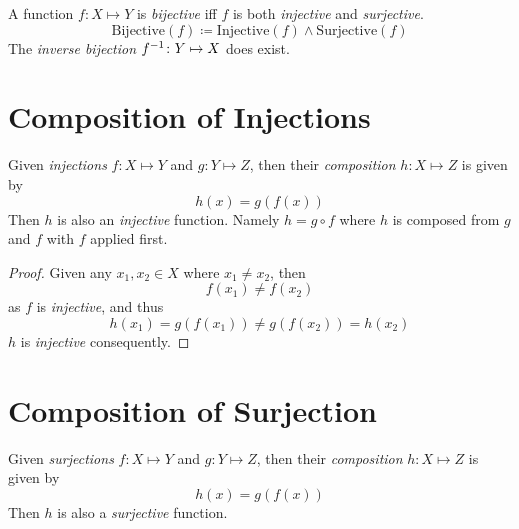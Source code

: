 \begin{definition}[Bijection]
    A function $f \colon X \mapsto Y$ is \textit{bijective} iff $f$ is both \textit{injective} and \textit{surjective}.
    \begin{equation}
        \mathrm{Bijective}(f) \coloneqq \mathrm{Injective}(f) \land \mathrm{Surjective}(f)
    \end{equation}
    The \textit{inverse bijection} ${f}^{-1} \colon Y \mapsto X$ does exist.
\end{definition}

\section{Composition of Injections}
\begin{proposition}
    Given \textit{injections} $f \colon X \mapsto Y$ and $g \colon Y \mapsto Z$, then their \textit{composition} $h \colon X \mapsto Z$ is given by
    \begin{equation}
        h(x) = g(f(x))
    \end{equation}
    Then $h$ is also an \textit{injective} function. Namely $h = g \circ f$ where $h$ is composed from $g$ and $f$ with $f$ applied first.
\end{proposition}

\begin{proof}
    Given any $x_1, x_2 \in X$ where $x_1 \neq x_2$, then
    \begin{equation}
        f(x_1) \ne f(x_2)
    \end{equation}
    as $f$ is \textit{injective}, and thus
    \begin{equation}
        h(x_1) = g(f(x_1)) \neq g(f(x_2)) = h(x_2)
    \end{equation}
    $h$ is \textit{injective} consequently.
\end{proof}

\section{Composition of Surjection}
\begin{proposition}
    Given \textit{surjections} $f \colon X \mapsto Y$ and $g \colon Y \mapsto Z$, then their \textit{composition} $h \colon X \mapsto Z$ is given by
    \begin{equation}
        h(x) = g(f(x))
    \end{equation}
    Then $h$ is also a \textit{surjective} function.
\end{proposition}

